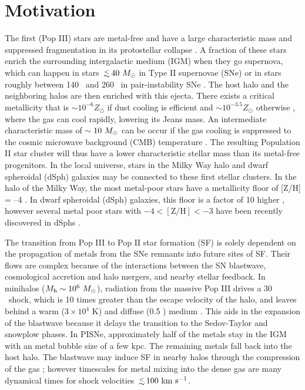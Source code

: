 \documentclass[apjl]{emulateapj}
\begin{document}

\section{Motivation}

The first (Pop III) stars are metal-free and have a large
characteristic mass and suppressed fragmentation in its protostellar
collapse \citep{Abel00, ABN02, Bromm02_P3, Yoshida03, OShea07a}.  A
fraction of these stars enrich the surrounding intergalactic medium
(IGM) when they go supernova, which can happen in stars $\lsim40~\Ms$
in Type II supernovae (SNe) or in stars roughly between 140 \Ms~and
260 \Ms~in pair-instability SNe \citep[PISNe;][]{2002ApJ...567..532H}.
The host halo and the neighboring halos are then enriched with this
ejecta.  There exists a critical metallicity that is $\sim 10^{-6}
Z_\odot$ if dust cooling is efficient \citep{Omukai05,
  Schneider06_Frag, clark08} and $\sim 10^{-3.5} Z_\odot$ otherwise
\citep{Bromm01, 2009ApJ...691..441S}, where the gas can cool rapidly,
lowering its Jeans mass.  An intermediate characteristic mass of
$\sim10~\Ms$ can be occur if the gas cooling is suppressed to the
cosmic microwave background (CMB) temperature \citep{Larson98,
  Tumlinson07_IMF, 2009ApJ...691..441S}.  The resulting Population II
star cluster will thus have a lower characteristic stellar mass than
its metal-free progenitors.  In the local universe, stars in the Milky
Way halo and dwarf spheroidal (dSph) galaxies may be connected to
these first stellar clusters.  In the halo of the Milky Way, the most
metal-poor stars have a metallicity floor of [Z/H] = --4
\citep{Beers05}.  In dwarf spheroidal (dSph) galaxies, this floor is a
factor of 10 higher \citep{Tolstoy04, Helmi06}, however several metal
poor stars with $-4 < [\mathrm{Z/H}] < -3$ have been recently
discovered in dSphs \citep{Tafelmeyer10, Frebel10_Obs}.

The transition from Pop III to Pop II star formation (SF) is solely
dependent on the propagation of metals from the SNe remnants into
future sites of SF.  Their flows are complex because of the
interactions between the SN blastwave, cosmological accretion and halo
mergers, and nearby stellar feedback.  In minihalos ($M_{\rm h} \sim
10^6~\Ms$), radiation from the massive Pop III drives a 30 \kms~shock,
which is 10 times greater than the escape velocity of the halo, and
leaves behind a warm ($3 \times 10^4$ K) and diffuse (0.5 \cubecm)
medium \citep{Kitayama04, Whalen04, Abel07}.  This aids in the
expansion of the blastwave because it delays the transition to the
Sedov-Taylor and snowplow phases.  In PISNe, approximately half of the
metals stay in the IGM with an metal bubble size of a few kpc.  The
remaining metals fall back into the host halo.  The blastwave may
induce SF in nearby halos through the compression of the gas
\citep{Ferrara98}; however timescales for metal mixing into the dense
gas are many dynamical times \citep{Cen08} for shock velocities $\lsim
100~\kms$.
\end{document}
